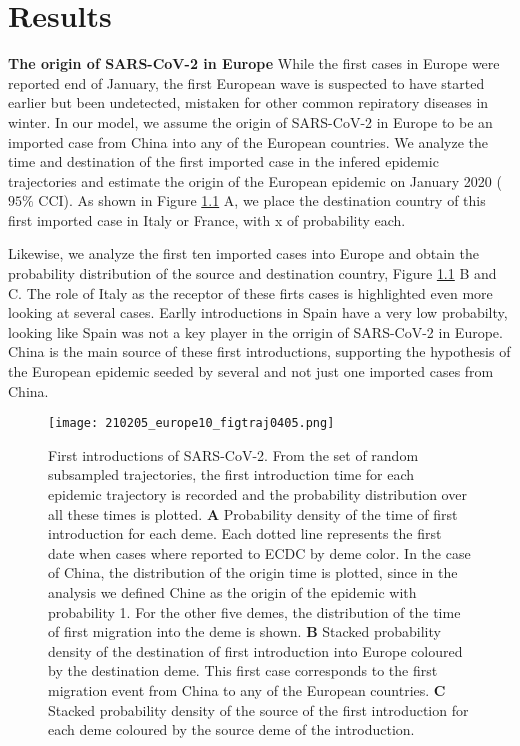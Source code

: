 \chapter{Results}

\textbf{The origin of SARS-CoV-2 in Europe} 
While the first cases in Europe were reported end of January, the first European wave is suspected to have started earlier but been undetected, mistaken for other common repiratory diseases in winter. In our model, we assume the origin of SARS-CoV-2 in Europe to be an imported case from China into any of the European countries. We analyze the time and destination of the first imported case in the infered epidemic trajectories and estimate the origin of the European epidemic on January 2020 ($95\%$ CCI). As shown in Figure \ref{fig:firstEUcase} A, we place the destination country of this first imported case in Italy or France, with x of probability each.  

Likewise, we analyze the first ten imported cases into Europe and obtain the probability distribution of the source and destination country, Figure \ref{fig:firstEUcase} B and C.  The role of Italy as the receptor of these firts cases is highlighted even more looking at several cases. Earlly introductions in Spain have a very low probabilty, looking like Spain was not a key player in the orrigin of SARS-CoV-2 in Europe. China is the main source of these first introductions, supporting the hypothesis of the European epidemic seeded by several and not just one imported cases from China.

\begin{figure}[p]
    \centering
    \texttt{[image: 210205\_europe10\_figtraj0405.png]}
    \caption{First introductions of SARS-CoV-2. From the set of random subsampled trajectories, the first introduction time for each epidemic trajectory is recorded and the probability distribution over all these times is plotted. \textbf{A} Probability density of the time of first introduction for each deme. Each dotted line represents the first date when cases where reported to ECDC by deme color. In the case of China, the distribution of the origin time is plotted, since in the analysis we defined Chine as the origin of the epidemic with probability 1. For the other five demes, the distribution of the time of first migration into the deme is shown. \textbf{B} Stacked probability density of the destination of first introduction into Europe coloured by the destination deme. This first case corresponds to the first migration event from China to any of the European countries. \textbf{C} Stacked probability density of the source of the first introduction for each deme coloured by the source deme of the introduction.}
    \label{fig:firstEUcase}
\end{figure}


